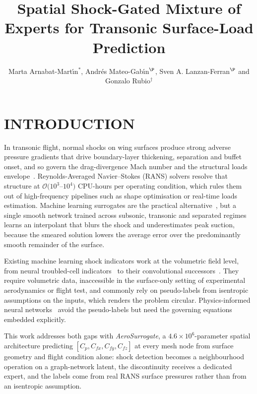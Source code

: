 \documentclass{WCCM-ECCOMAS_2026_Full_Paper}
\title{Spatial Shock-Gated Mixture of Experts for Transonic Surface-Load Prediction}
\author{Marta Arnabat-Mart\'{\i}n$^{*}$, Andr\'{e}s Mateo-Gab\'{\i}n$^{\P}$, Sven A. Lanzan-Ferran$^{\P}$ and Gonzalo Rubio$^{\dag}$}
\begin{document}
\maketitle

\section{INTRODUCTION}

In transonic flight, normal shocks on wing surfaces produce strong
adverse pressure gradients that drive boundary-layer thickening,
separation and buffet onset, and so govern the drag-divergence Mach
number and the structural loads envelope~\cite{Vassberg2008,Levy2013}.
Reynolds-Averaged Navier--Stokes (RANS) solvers resolve that structure
at $\mathcal{O}(10^{3}$--$10^{4})$ CPU-hours per operating condition,
which rules them out of high-frequency pipelines such as shape
optimisation or real-time loads estimation.  Machine learning
surrogates are the practical alternative~\cite{Han2018,Bhatnagar2019},
but a single smooth network trained across subsonic, transonic and
separated regimes learns an interpolant that blurs the shock and
underestimates peak suction, because the smeared solution lowers the
average error over the predominantly smooth remainder of the
surface.

Existing machine learning shock indicators work at the volumetric
field level, from neural troubled-cell indicators~\cite{Ray2018} to
their convolutional successors~\cite{Discacciati2020}.  They require
volumetric data, inaccessible in the surface-only setting of
experimental aerodynamics or flight test, and commonly rely on
pseudo-labels from isentropic assumptions on the inputs, which renders
the problem circular.  Physics-informed neural
networks~\cite{Raissi2019} avoid the pseudo-labels but need the
governing equations embedded explicitly.

This work addresses both gaps with \emph{AeroSurrogate}, a
$4.6\times 10^{6}$-parameter spatial architecture predicting
$[C_p, C_{fx}, C_{fy}, C_{fz}]$ at every mesh node from surface
geometry and flight condition alone: shock detection becomes a
neighbourhood operation on a graph-network latent, the discontinuity
receives a dedicated expert, and the labels come from real RANS
surface pressures rather than from an isentropic assumption.

\end{document}
